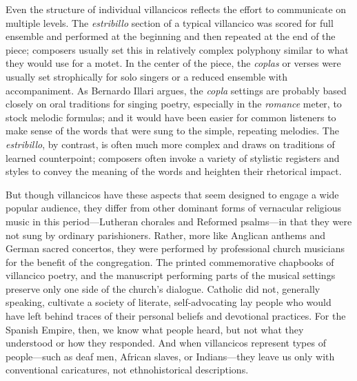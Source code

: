 Even the structure of individual villancicos reflects the effort to communicate
on multiple levels.
The \emph{estribillo} section of a typical villancico was scored for full
ensemble and performed at the beginning and then repeated at the end of the
piece; composers usually set this in relatively complex polyphony similar to
what they would use for a motet.
In the center of the piece, the \emph{coplas} or verses were usually set
strophically for solo singers or a reduced ensemble with accompaniment.
As Bernardo Illari argues, the \emph{copla} settings are probably based closely
on oral traditions for singing poetry, especially in the \emph{romance} meter,
to stock melodic formulas; and it would have been easier for common listeners to
make sense of the words that were sung to the simple, repeating melodies.%
    \Autocite{Illari:Polychoral}
The \emph{estribillo}, by contrast, is often much more complex and draws on
traditions of learned counterpoint; composers often invoke a variety of
stylistic registers and styles to convey the meaning of the words and heighten
their rhetorical impact.

But though villancicos have these aspects that seem designed to engage a wide
popular audience, they differ from other dominant forms of vernacular religious
music in this period---Lutheran chorales and Reformed psalms---in that they were
not sung by ordinary parishioners.
Rather, more like Anglican anthems and German sacred concertos, they were
performed by professional church musicians for the benefit of the congregation.
The printed commemorative chapbooks of villancico poetry, and the manuscript
performing parts of the musical settings preserve only one side of the church's
dialogue.
Catholic did not, generally speaking, cultivate a society of literate,
self-advocating lay people who would have left behind traces of their personal
beliefs and devotional practices.
For the Spanish Empire, then, we know what people heard, but not what they
understood or how they responded.%
    \Autocite{Burstyn:PeriodEar} %
And when villancicos represent types of people---such as deaf men, African
slaves, or Indians---they leave us only with conventional caricatures, not
ethnohistorical descriptions.%
    \Autocites
    {Baker:EthnicVC}
    {Baker:PerformancePostColonial}
    {Davies:LocalContent}

